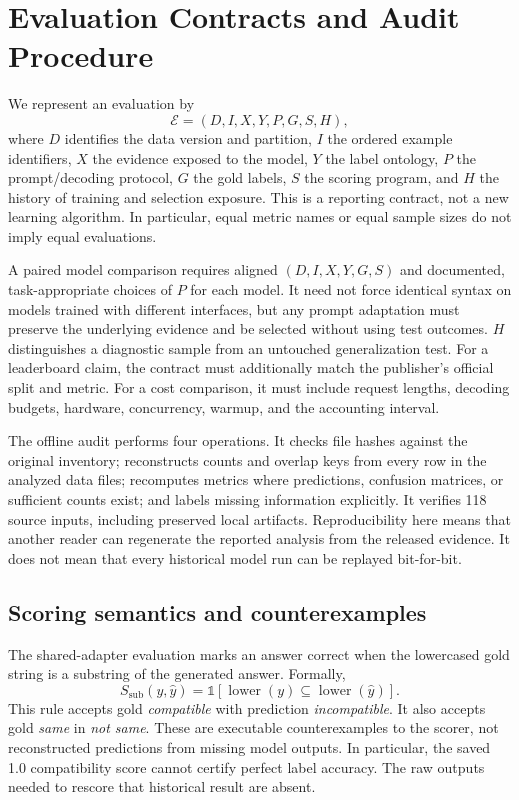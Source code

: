 \section{Evaluation Contracts and Audit Procedure}
\label{sec:contract}
We represent an evaluation by
\begin{equation}
 \mathcal{E}=(D,I,X,Y,P,G,S,H),
\end{equation}
where $D$ identifies the data version and partition, $I$ the ordered example identifiers, $X$ the evidence exposed to the model, $Y$ the label ontology, $P$ the prompt/decoding protocol, $G$ the gold labels, $S$ the scoring program, and $H$ the history of training and selection exposure. This is a reporting contract, not a new learning algorithm. In particular, equal metric names or equal sample sizes do not imply equal evaluations.

A paired model comparison requires aligned $(D,I,X,Y,G,S)$ and documented, task-appropriate choices of $P$ for each model. It need not force identical syntax on models trained with different interfaces, but any prompt adaptation must preserve the underlying evidence and be selected without using test outcomes. $H$ distinguishes a diagnostic sample from an untouched generalization test. For a leaderboard claim, the contract must additionally match the publisher's official split and metric. For a cost comparison, it must include request lengths, decoding budgets, hardware, concurrency, warmup, and the accounting interval.

The offline audit performs four operations. It checks file hashes against the original inventory; reconstructs counts and overlap keys from every row in the analyzed data files; recomputes metrics where predictions, confusion matrices, or sufficient counts exist; and labels missing information explicitly. It verifies 118 source inputs, including preserved local artifacts. Reproducibility here means that another reader can regenerate the reported analysis from the released evidence. It does not mean that every historical model run can be replayed bit-for-bit.

\subsection{Scoring semantics and counterexamples}
\label{sec:scorers}
The shared-adapter evaluation marks an answer correct when the lowercased gold string is a substring of the generated answer. Formally,
\begin{equation}
 S_{\mathrm{sub}}(y,\hat y)=\mathbb{1}[\operatorname{lower}(y)\subseteq\operatorname{lower}(\hat y)].
\end{equation}
This rule accepts gold \emph{compatible} with prediction \emph{incompatible}. It also accepts gold \emph{same} in \emph{not same}. These are executable counterexamples to the scorer, not reconstructed predictions from missing model outputs. In particular, the saved 1.0 compatibility score cannot certify perfect label accuracy. The raw outputs needed to rescore that historical result are absent.

